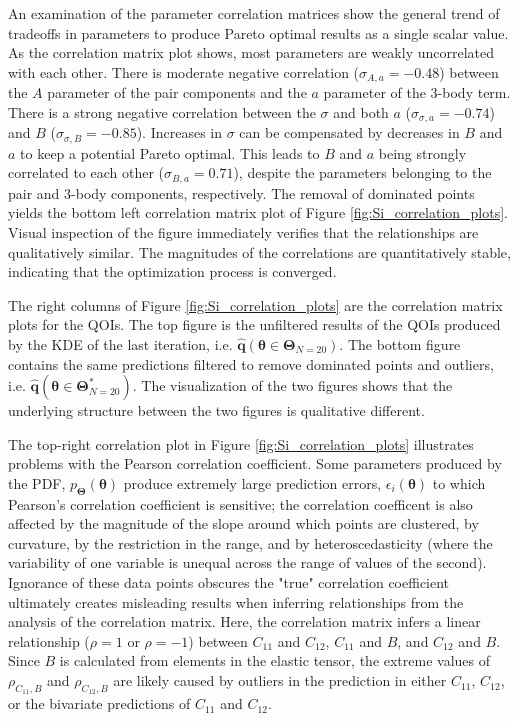 An examination of the parameter correlation matrices show the general trend of tradeoffs in parameters to produce Pareto optimal results as a single scalar value.  As the correlation matrix plot shows, most parameters are weakly uncorrelated with each other.
There is moderate negative correlation ($\sigma_{A,a}=-0.48$) between the $A$ parameter of the pair components and the $a$ parameter of the 3-body term.
There is a strong negative correlation between the $\sigma$ and both $a$ ($\sigma_{\sigma,a}=-0.74$) and $B$ ($\sigma_{\sigma,B}=-0.85$).  Increases in $\sigma$ can be compensated by decreases in $B$ and $a$ to keep a potential Pareto optimal.
This leads to $B$ and $a$ being strongly correlated to each other ($\sigma_{B,a}=0.71$), despite the parameters belonging to the pair and 3-body components, respectively.
The removal of dominated points yields the bottom left correlation matrix plot of Figure \ref{fig:Si_correlation_plots}.
Visual inspection of the figure immediately verifies that the relationships are qualitatively similar.
The magnitudes of the correlations are quantitatively stable, indicating that the optimization process is converged.

The right columns of Figure \ref{fig:Si_correlation_plots} are the correlation matrix plots for the QOIs.
The top figure is the unfiltered results of the QOIs produced by the KDE of the last iteration, i.e. $\hat{\bm{q}}(\bm{\theta} \in \bm{\Theta}_{N=20})$.
The bottom figure contains the same predictions filtered to remove dominated points and outliers, i.e. $\hat{\bm{q}}(\bm{\theta} \in \bm{\Theta}_{N=20}^*)$.
The visualization of the two figures shows that the underlying structure between the two figures is qualitative different.

The top-right correlation plot in Figure \ref{fig:Si_correlation_plots} illustrates problems with the Pearson correlation coefficient.
Some parameters produced by the PDF, $p_{\bm{\Theta}}(\bm{\theta})$ produce extremely large prediction errors, $\epsilon_i(\bm{\theta})$ to which Pearson’s correlation coefficient is sensitive; the correlation coefficent is also affected by the magnitude of the slope around which points are clustered, by curvature, by the restriction in the range, and by heteroscedasticity (where the variability of one variable is unequal across the range of values of the second).\cite{wilcox2011_estimation_1,wilcox2011_estimation_2}
Ignorance of these data points obscures the "true" correlation coefficient ultimately creates misleading results when inferring relationships from the analysis of the correlation matrix.  Here, the correlation matrix infers a linear relationship ($\rho=1$ or $\rho=-1$) between $C_{11}$ and $C_{12}$, $C_{11}$ and $B$, and $C_{12}$ and $B$.
Since $B$ is calculated from elements in the elastic tensor, the extreme values of $\rho_{C_{11},B}$ and $\rho_{C_{12},B}$ are likely caused by outliers in the prediction in either $C_{11}$, $C_{12}$, or the bivariate predictions of $C_{11}$ and $C_{12}$.


